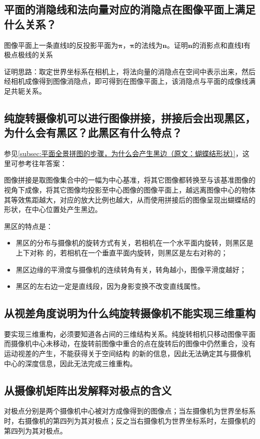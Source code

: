 \documentclass[11pt]{article}
\begin{document}
\subsection{平面的消隐线和法向量对应的消隐点在图像平面上满足什么关系？}
{\heiti 图像平面上一条直线$\mathbf{l}$的反投影平面为$\mathbold{\pi}$，$\mathbold{\pi}$的法线为$\mathbf{n}$。证明$\mathbf{n}$的消影点和直线$\mathbf{l}$有极点极线的关系}\par
证明思路：取定世界坐标系在相机上，将法向量的消隐点在空间中表示出来，然后经相机成像得到图像消隐点，即可得到在图像平面上，该消隐点与平面的成像线满足共轭关系。
\subsection{纯旋转摄像机可以进行图像拼接，拼接后会出现黑区，为什么会有黑区？此黑区有什么特点？}
参见\ref{subsec:平面全景拼图的步骤，为什么会产生黑边（原文：蝴蝶结形状）}，这里可参考往年答案：\par
图像拼接是取图像集合中的一幅为中心基准，将其它图像都转换至与该基准图像的视角下成像，将其它图像均投影至中心图像的图像平面上，越远离图像中心的物体其等效焦距越大，对应的放大比例也越大，从而使用拼接后的图像呈现出蝴蝶结的形状，在中心位置处产生黑边。\par
黑区的特点是：
\begin{itemize}
  \item 黑区的分布与摄像机的旋转方式有关，若相机在一个水平面内旋转，则黑区是上下对称 的，若相机在一个垂直平面内旋转，则黑区是左右对称的；
  \item 黑区边缘的平滑度与摄像机的连续转角有关，转角越小，图像平滑度越好；
  \item 黑区的左右边一定是直线段，因为身影变换不改变直线属性。
\end{itemize}
\subsection{从视差角度说明为什么纯旋转摄像机不能实现三维重构}
要实现三维重构，必须要知道各占间的三维结构关系。纯旋转相机只移动图像平面而摄像机中心未移动，在旋转前图像中重合的点在旋转后的图像中仍然重合，没有运动视差的产生，不能获得关于空间结构 的新的信息，因此无法确定其与摄像机中心的深度信息，因此无法完成三维重构。
\subsection{从摄像机矩阵出发解释对极点的含义}
对极点分别是两个摄像机中心被对方成像得到的图像点；当左摄像机为世界坐标系时，右摄像机的第四列为其对极点；反之当右摄像机为世界坐标系时，左摄像机的第四列为其对极点。
\end{document}
